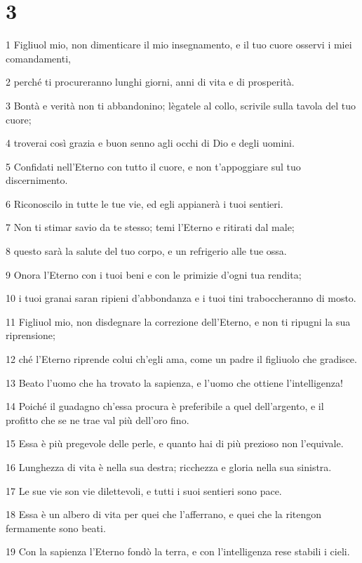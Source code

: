 \chapter{3}

\par 1 Figliuol mio, non dimenticare il mio insegnamento, e il tuo cuore osservi i miei comandamenti,
\par 2 perché ti procureranno lunghi giorni, anni di vita e di prosperità.
\par 3 Bontà e verità non ti abbandonino; lègatele al collo, scrivile sulla tavola del tuo cuore;
\par 4 troverai così grazia e buon senno agli occhi di Dio e degli uomini.
\par 5 Confidati nell'Eterno con tutto il cuore, e non t'appoggiare sul tuo discernimento.
\par 6 Riconoscilo in tutte le tue vie, ed egli appianerà i tuoi sentieri.
\par 7 Non ti stimar savio da te stesso; temi l'Eterno e ritirati dal male;
\par 8 questo sarà la salute del tuo corpo, e un refrigerio alle tue ossa.
\par 9 Onora l'Eterno con i tuoi beni e con le primizie d'ogni tua rendita;
\par 10 i tuoi granai saran ripieni d'abbondanza e i tuoi tini traboccheranno di mosto.
\par 11 Figliuol mio, non disdegnare la correzione dell'Eterno, e non ti ripugni la sua riprensione;
\par 12 ché l'Eterno riprende colui ch'egli ama, come un padre il figliuolo che gradisce.
\par 13 Beato l'uomo che ha trovato la sapienza, e l'uomo che ottiene l'intelligenza!
\par 14 Poiché il guadagno ch'essa procura è preferibile a quel dell'argento, e il profitto che se ne trae val più dell'oro fino.
\par 15 Essa è più pregevole delle perle, e quanto hai di più prezioso non l'equivale.
\par 16 Lunghezza di vita è nella sua destra; ricchezza e gloria nella sua sinistra.
\par 17 Le sue vie son vie dilettevoli, e tutti i suoi sentieri sono pace.
\par 18 Essa è un albero di vita per quei che l'afferrano, e quei che la ritengon fermamente sono beati.
\par 19 Con la sapienza l'Eterno fondò la terra, e con l'intelligenza rese stabili i cieli.
